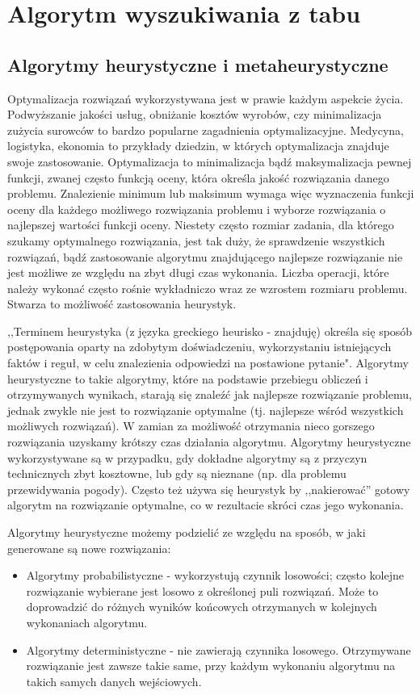\chapter{Algorytm wyszukiwania z tabu}
\section{Algorytmy heurystyczne i metaheurystyczne}
 Optymalizacja rozwiązań wykorzystywana jest w prawie każdym aspekcie życia. Podwyższanie jakości usług, obniżanie kosztów wyrobów, czy minimalizacja zużycia surowców to bardzo popularne zagadnienia optymalizacyjne. Medycyna, logistyka, ekonomia to przykłady dziedzin, w których optymalizacja znajduje swoje zastosowanie. 
 Optymalizacja to minimalizacja bądź maksymalizacja pewnej funkcji, zwanej często funkcją oceny, która określa jakość rozwiązania danego problemu. Znalezienie minimum lub maksimum wymaga więc wyznaczenia funkcji oceny dla każdego możliwego rozwiązania problemu i wyborze rozwiązania o najlepszej wartości funkcji oceny. Niestety często rozmiar zadania, dla którego szukamy optymalnego rozwiązania, jest tak duży, że sprawdzenie wszystkich rozwiązań, bądź zastosowanie algorytmu znajdującego najlepsze rozwiązanie nie jest możliwe ze względu na zbyt długi czas wykonania. Liczba operacji, które należy wykonać często rośnie wykładniczo wraz ze wzrostem rozmiaru problemu. Stwarza to możliwość zastosowania heurystyk.
 
 ,,Terminem heurystyka (z języka greckiego heurisko - znajduję) określa się sposób postępowania oparty na zdobytym doświadczeniu, wykorzystaniu istniejących faktów i reguł, w celu znalezienia odpowiedzi na postawione pytanie"\cite{Algorytmy:Widuch}. Algorytmy heurystyczne to takie algorytmy, które na podstawie przebiegu obliczeń i otrzymywanych wynikach, starają się znaleźć jak najlepsze rozwiązanie problemu, jednak zwykle nie jest to rozwiązanie optymalne (tj. najlepsze wśród wszystkich możliwych rozwiązań). W zamian za możliwość otrzymania nieco gorszego rozwiązania uzyskamy krótszy czas działania algorytmu. Algorytmy heurystyczne wykorzystywane są w przypadku, gdy dokładne algorytmy są z przyczyn technicznych zbyt kosztowne, lub gdy są nieznane (np. dla problemu przewidywania pogody). Często też używa się heurystyk by ,,nakierować'' gotowy algorytm na rozwiązanie optymalne, co w rezultacie skróci czas jego wykonania.
 
 Algorytmy heurystyczne możemy podzielić ze względu na sposób, w jaki generowane są nowe rozwiązania:
 \begin{itemize}
 	\item Algorytmy probabilistyczne - wykorzystują czynnik losowości; często kolejne rozwiązanie wybierane jest losowo z określonej puli rozwiązań. Może to doprowadzić do różnych wyników końcowych otrzymanych w kolejnych wykonaniach algorytmu.
 	\item Algorytmy deterministyczne - nie zawierają czynnika losowego. Otrzymywane rozwiązanie jest zawsze takie same, przy każdym wykonaniu algorytmu na takich samych danych wejściowych. 	
 \end{itemize}

